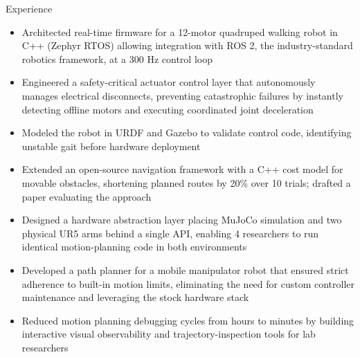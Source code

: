 \documentclass{resume}
\begin{document}
\begin{experienceSection}{Experience}
	\experienceItem[
		company={Noblis, Inc.},
		location={Reston, VA},
		position={Autonomous Systems Engineering Intern},
		duration={June 2026 – August 2026}
	]
	\begin{itemize}
		\vspace{-0.2em}
		\itemsep -6pt
		\item Architected real-time firmware for a 12-motor quadruped walking robot in C++ (Zephyr RTOS) allowing integration with ROS 2, the industry-standard robotics framework, at a 300 Hz control loop
		\item Engineered a safety-critical actuator control layer that autonomously manages electrical disconnects, preventing catastrophic failures by instantly detecting offline motors and executing coordinated joint deceleration
		\item Modeled the robot in URDF and Gazebo to validate control code, identifying unstable gait before hardware deployment
		\item Extended an open-source navigation framework with a C++ cost model for movable obstacles, shortening planned routes by 20\% over 10 trials; drafted a paper evaluating the approach
	\end{itemize}
	\experienceItem[
		company={Kavraki Computational Robotics Lab},
		location={Houston, TX},
		position={Research Assistant},
		duration={August 2025 – May 2026}
	]
	\begin{itemize}
		\vspace{-0.2em}
		\itemsep -6pt
		\item Designed a hardware abstraction layer placing MuJoCo simulation and two physical UR5 arms behind a single API, enabling 4 researchers to run identical motion-planning code in both environments
		\item Developed a path planner for a mobile manipulator robot that ensured strict adherence to built-in motion limits, eliminating the need for custom controller maintenance and leveraging the stock hardware stack
		\item Reduced motion planning debugging cycles from hours to minutes by building interactive visual observability and trajectory-inspection tools for lab researchers
	\end{itemize}
	\experienceItem[
		company={Rice University},
		location={Houston, TX},
		position={Computer Systems Teaching Assistant},
		duration={August 2025 – December 2025}
	]
	\begin{itemize}

\end{itemize}
\end{experienceSection}
\end{document}
